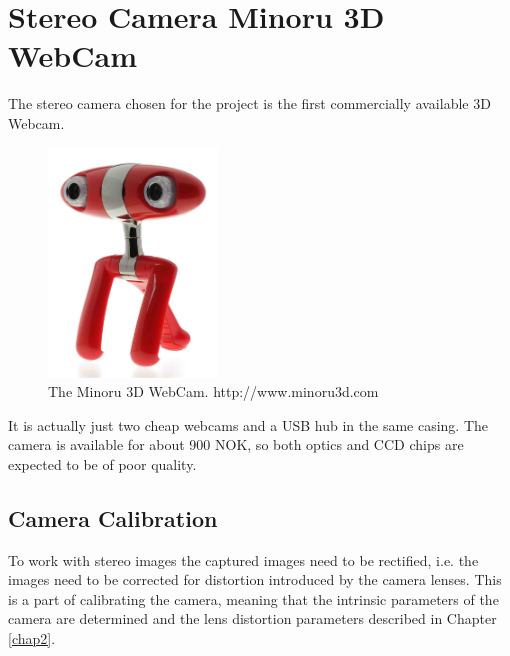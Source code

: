 \section{Stereo Camera Minoru 3D WebCam}
The stereo camera chosen for the project is the first commercially available 3D Webcam.
\begin{figure}[htbp]
    \centering
    \includegraphics[width=0.4\textwidth]{pics/minoru3d}
    \caption{The Minoru 3D WebCam. http://www.minoru3d.com}
    \label{chap3:fig-minoru}
\end{figure}
It is actually just two cheap webcams and a USB hub in the same casing. The camera is
available for about 900 NOK, so both optics and CCD chips are expected to be of poor
quality.


\subsection{Camera Calibration}
To work with stereo images the captured images need to be rectified, i.e. the images need
to be corrected for distortion introduced by the camera lenses. This is a part of
calibrating the camera, meaning that the intrinsic parameters of the camera are
determined and the lens distortion parameters described in Chapter \ref{chap2}.

